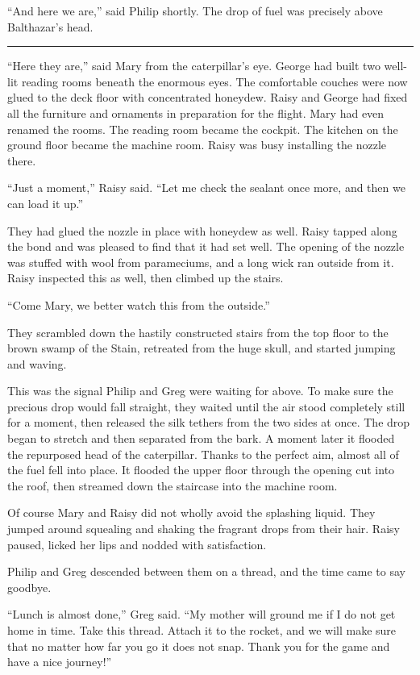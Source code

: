 \documentclass[10pt, draft]{memoir}
\renewcommand{\pfbreakdisplay}{\bigskip \ding{166} \bigskip}
\newcommand{\secbreak}{\fancybreak{\pfbreakdisplay}}
\begin{document}
``And here we are,'' said Philip shortly. The drop of fuel was precisely above Balthazar's head.

\secbreak

``Here they are,'' said Mary from the caterpillar's eye. George had built two well-lit reading rooms beneath the enormous eyes. The comfortable couches were now glued to the deck floor with concentrated honeydew. Raisy and George had fixed all the furniture and ornaments in preparation for the flight. Mary had even renamed the rooms. The reading room became the cockpit. The kitchen on the ground floor became the machine room. Raisy was busy installing the nozzle there.

``Just a moment,'' Raisy said. ``Let me check the sealant once more, and then we can load it up.''

They had glued the nozzle in place with honeydew as well. Raisy tapped along the bond and was pleased to find that it had set well. The opening of the nozzle was stuffed with wool from parameciums, and a long wick ran outside from it. Raisy inspected this as well, then climbed up the stairs.

``Come Mary, we better watch this from the outside.''

They scrambled down the hastily constructed stairs from the top floor to the brown swamp of the Stain, retreated from the huge skull, and started jumping and waving.

This was the signal Philip and Greg were waiting for above. To make sure the precious drop would fall straight, they waited until the air stood completely still for a moment, then released the silk tethers from the two sides at once. The drop began to stretch and then separated from the bark. A moment later it flooded the repurposed head of the caterpillar. Thanks to the perfect aim, almost all of the fuel fell into place. It flooded the upper floor through the opening cut into the roof, then streamed down the staircase into the machine room.

Of course Mary and Raisy did not wholly avoid the splashing liquid. They jumped around squealing and shaking the fragrant drops from their hair. Raisy paused, licked her lips and nodded with satisfaction.

Philip and Greg descended between them on a thread, and the time came to say goodbye.

``Lunch is almost done,'' Greg said. ``My mother will ground me if I do not get home in time. Take this thread. Attach it to the rocket, and we will make sure that no matter how far you go it does not snap. Thank you for the game and have a nice journey!''
\end{document}
